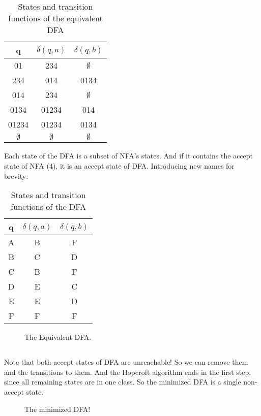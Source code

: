 \documentclass{article}
\numberwithin{equation}{subsection}
\begin{document}
\subsection{}
\begin{table}[H]
\centering
\begin{tabular}{c|c|c}
q & \(\delta(q, a)\) & \(\delta(q, b)\)\\
\hline
01 & 234 & \(\emptyset\)\\
234 & 014 & 0134\\
014 & 234 & \(\emptyset\)\\
0134 & 01234 & 014\\
01234 & 01234 & 0134\\
\(\emptyset\) & \(\emptyset\) & \(\emptyset\)
\end{tabular}
\caption{States and transition functions of the equivalent DFA}
\end{table}
Each state of the DFA is a subset of NFA's states.
And if it contains the accept state of NFA (4), it is an accept state of DFA.
Introducing new names for brevity:
\begin{table}[H]
\centering
\begin{tabular}{c|c|c}
q & \(\delta(q, a)\) & \(\delta(q, b)\)\\
\hline
A & B & F\\
B & C & D\\
C & B & F\\
D & E & C\\
E & E & D\\
F & F & F
\end{tabular}
\caption{States and transition functions of the DFA}
\end{table}
\begin{figure}[H]
\centering

\caption{The Equivalent DFA.}
\label{fig:automata2-1}
\end{figure}

\subsection{}
Note that both accept states of DFA are unreachable!
So we can remove them and the transitions to them.
And the Hopcroft algorithm ends in the first step, since all remaining states are in one class.
So the minimized DFA is a single non-accept state.
\begin{figure}[H]
\centering

\caption{The minimized DFA!}
\label{fig:automata2-2}
\end{figure}
\end{document}
